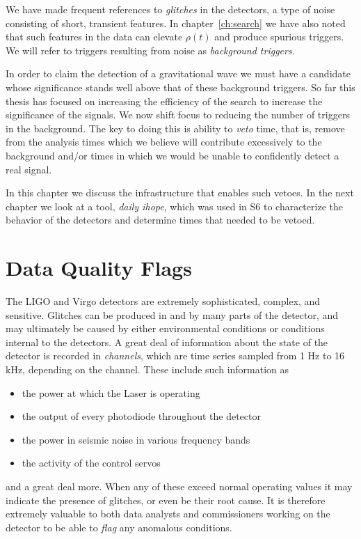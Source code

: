 We have made frequent references to \emph{glitches} in the detectors,
a type of noise consisting of short, transient features.  In
chapter~\ref{ch:search} we have also noted that such features in the
data can elevate $\rho(t)$ and produce spurious triggers.  We will
refer to triggers resulting from noise as \emph{background triggers}.

In order to claim the detection of a gravitational wave we must have a
candidate whose significance stands well above that of these
background triggers.  So far this thesis has focused on increasing the
efficiency of the search to increase the significance of the signals.
We now shift focus to reducing the number of triggers in the
background.  The key to doing this is ability to \emph{veto} time,
that is, remove from the analysis times which we believe will
contribute excessively to the background and/or times in which we
would be unable to confidently detect a real signal.

In this chapter we discuss the infrastructure that enables such
vetoes.  In the next chapter we look at a tool, \emph{daily ihope},
which was used in S6 to characterize the behavior of the detectors and
determine times that needed to be vetoed.


\section{Data Quality Flags}
\label{sec:dq_flags}

The LIGO and Virgo detectors are extremely sophisticated, complex, and
sensitive.  Glitches can be produced in and by many parts of the
detector, and may ultimately be caused by either environmental
conditions or conditions internal to the detectors.  A great deal of
information about the state of the detector is recorded in
\emph{channels}, which are time series sampled from 1 Hz to 16 kHz,
depending on the channel.  These include such information as
\begin{itemize}
\item the power at which the Laser is operating
\item the output of every photodiode throughout the detector
\item the power in seismic noise in various frequency bands
\item the activity of the control servos
\end{itemize}
%
and a great deal more.  When any of these exceed normal operating
values it may indicate the presence of glitches, or even be their root
cause.  It is therefore extremely valuable to both data analysts and 
commissioners working on the detector to be able to \emph{flag} any
anomalous conditions.

